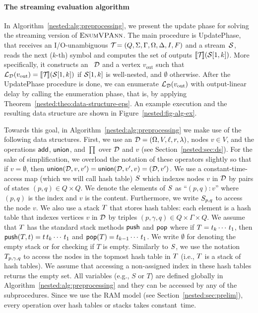 \paragraph{The streaming evaluation algorithm} In Algorithm~\ref{nested:alg:preprocessing}, we present the update phase for solving the streaming version of $\textsc{EnumVPAnn}$. The main procedure is {\sc UpdatePhase}, that receives an I/O-unambiguous \vpann $\mathcal{T}\! = (Q, \Sigma, \Gamma, \Omega, \Delta, I, F)$ and a stream~$\mathcal{S}$, reads the next ($k$-th) symbol and computes the set of outputs $\llbracket \mathcal{T}\! \rrbracket(\mathcal{S}[1,k])$.
More specifically, it constructs an \dsepsabbr~$\mathcal{D}$ and a vertex $v_{\text{out}}$ such that $\mathcal{L}_{\mathcal{D}}(v_{\text{out}}) = {\llbracket{\mathcal{T}\!}\rrbracket}(\mathcal{S}[1,k])$ if $\mathcal{S}[1,k]$ is well-nested, and $\emptyset$ otherwise.
After the {\sc UpdatePhase} procedure is done, we can enumerate $\mathcal{L}_{\mathcal{D}}(v_{\text{out}})$ with output-linear delay by calling the enumeration phase, that is, by applying Theorem~\ref{nested:theo:data-structure-eps}. An example execution and the resulting data structure are shown in Figure~\ref{nested:fig-alg-ex}.

Towards this goal, in Algorithm~\ref{nested:alg:preprocessing} we make use of the following data structures. First, we use an \dsepsabbr $\mathcal{D} = (\Omega, V, \ell, r, \lambda)$, nodes $v \in V$, and the operations $\mathsf{add}$, $\mathsf{union}$, and $\prod$ over $\mathcal{D}$ and $v$ (see Section~\ref{nested:sec:ds}). For the sake of simplification, we overload the notation of these operators slightly so that if $v = \emptyset$, then $\mathsf{union}(\mathcal{D},v,v') = \mathsf{union}(\mathcal{D},v',v) = (\mathcal{D},v')$. 
We use a constant-time-access map (which we will call hash table) $S$ which indexes nodes $v$ in $\mathcal{D}$ by pairs of states $(p,q) \in Q\times Q$. We denote the elements of $S$ as ``$(p,q) : v$'' where $(p,q)$ is the index and $v$ is the content. Furthermore, we write $S_{p,q}$ to access the node $v$. We also use a stack $T$ that stores hash tables: each element is a hash table that indexes vertices $v$ in $\mathcal{D}$ by triples $(p, \gamma, q) \in Q \times \Gamma \times Q$. 
We assume that $T$ has the standard stack methods $\mathsf{push}$ and $\mathsf{pop}$ where if $T = t_k\cdots\,t_1$, then $\mathsf{push}(T,t) = t\, t_k\cdots\,t_1$ and $\mathsf{pop}(T) = t_{k-1}\cdots\,t_1$. We write $\emptyset$ for denoting the empty stack or for checking if $T$ is empty.
Similarly to $S$, we use the notation $T_{p,\gamma,q}$ to access the nodes in the topmost hash table in $T$ (i.e., $T$ is a stack of hash tables). 
We assume that accessing a non-assigned index in these hash tables returns the empty set.
All variables (e.g., $S$ or $T$) are defined globally in Algorithm~\ref{nested:alg:preprocessing} and they can be accessed by any of the subprocedures. 
Since we use the RAM model (see Section~\ref{nested:sec:prelim}), every operation over hash tables or stacks takes constant~time. 

